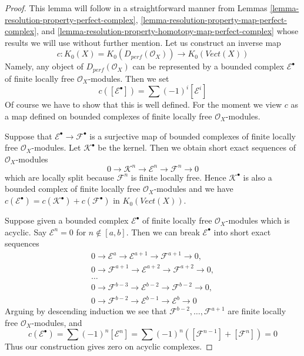 \begin{proof}
This lemma will follow in a straightforward manner from
Lemmas \ref{lemma-resolution-property-perfect-complex},
\ref{lemma-resolution-property-map-perfect-complex}, and
\ref{lemma-resolution-property-homotopy-map-perfect-complex}
whose results we will use without further mention.
Let us construct an inverse map
$$
c : K_0(X) = K_0(D_{perf}(\mathcal{O}_X)) \longrightarrow
K_0(\textit{Vect}(X))
$$
Namely, any object of $D_{perf}(\mathcal{O}_X)$ can be represented
by a bounded complex $\mathcal{E}^\bullet$ of finite locally free
$\mathcal{O}_X$-modules. Then we set
$$
c([\mathcal{E}^\bullet]) = \sum (-1)^i[\mathcal{E}^i]
$$
Of course we have to show that this is well defined. For the moment
we view $c$ as a map defined on bounded complexes of finite locally free
$\mathcal{O}_X$-modules.

\medskip\noindent
Suppose that $\mathcal{E}^\bullet \to \mathcal{F}^\bullet$ is a surjective map
of bounded complexes of finite locally free $\mathcal{O}_X$-modules.
Let $\mathcal{K}^\bullet$ be the kernel. Then we obtain short exact
sequences of $\mathcal{O}_X$-modules
$$
0 \to \mathcal{K}^n \to \mathcal{E}^n \to \mathcal{F}^n \to 0
$$
which are locally split because $\mathcal{F}^n$ is finite locally free.
Hence $\mathcal{K}^\bullet$ is also a bounded complex of finite
locally free $\mathcal{O}_X$-modules and we have
$c(\mathcal{E}^\bullet) = c(\mathcal{K}^\bullet) + c(\mathcal{F}^\bullet)$
in $K_0(\textit{Vect}(X))$.

\medskip\noindent
Suppose given a bounded complex $\mathcal{E}^\bullet$
of finite locally free $\mathcal{O}_X$-modules which is acyclic.
Say $\mathcal{E}^n = 0$ for $n \not \in [a, b]$. Then we
can break $\mathcal{E}^\bullet$ into short exact sequences
$$
\begin{matrix}
0 \to \mathcal{E}^a \to \mathcal{E}^{a + 1} \to \mathcal{F}^{a + 1} \to 0,\\
0 \to \mathcal{F}^{a + 1} \to \mathcal{E}^{a + 2} \to
\mathcal{F}^{a + 2} \to 0, \\
\ldots \\
0 \to \mathcal{F}^{b - 3} \to \mathcal{E}^{b - 2} \to
\mathcal{F}^{b - 2} \to 0, \\
0 \to \mathcal{F}^{b - 2} \to \mathcal{E}^{b - 1} \to \mathcal{E}^b \to 0
\end{matrix}
$$
Arguing by descending induction we see that
$\mathcal{F}^{b - 2}, \ldots, \mathcal{F}^{a + 1}$
are finite locally free $\mathcal{O}_X$-modules, and
$$
c(\mathcal{E}^\bullet) = \sum (-1)^n[\mathcal{E}^n] =
\sum (-1)^n([\mathcal{F}^{n - 1}] + [\mathcal{F}^n]) = 0
$$
Thus our construction gives zero on acyclic complexes.


\end{proof}
